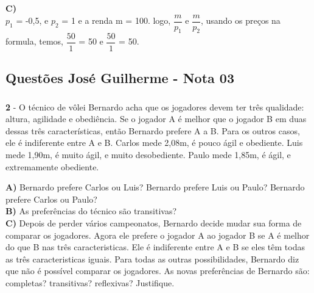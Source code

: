 \begin{flushleft}
\textbf{C)}
\\
$p_{1}$ = -0,5, e $p_{2}$ = 1 e a renda m = 100.
\singlespacing
logo, $\dfrac{m}{p_{1}}$ e $\dfrac{m}{p_{2}}$, usando os preços na formula, temos, $\dfrac{50}{1}$ = 50 e $\dfrac{50}{1}$ = 50. 

\begin{center}

\end{center}

\begin{center}
	\section*{Questões José Guilherme - Nota 03}
\end{center}

\subparagraph{}
\textbf{2} - O técnico de vôlei Bernardo acha que os jogadores devem ter três qualidade: altura, agilidade e obediência. Se o jogador A é melhor que o jogador B em duas dessas três características, então Bernardo prefere A a B. Para os outros casos, ele é indiferente entre A e B. Carlos mede 2,08m, é pouco ágil e obediente. Luis mede 1,90m, é muito ágil, e muito desobediente. Paulo mede 1,85m, é ágil, e extremamente obediente.
\singlespacing

\textbf{A)} Bernardo prefere Carlos ou Luis? Bernardo prefere Luis ou Paulo? Bernardo prefere Carlos ou Paulo?
\\
\textbf{B)} As preferências do técnico são transitivas?
\\
\textbf{C)} Depois de perder vários campeonatos, Bernardo decide mudar sua forma de comparar os jogadores. Agora ele prefere o jogador A ao jogador B se A é melhor do que B nas três caracteristicas. Ele é indiferente entre A e B se eles têm todas as três caracteristicas iguais. Para todas as outras possibilidades, Bernardo diz que não é possível comparar os jogadores. As novas preferências de Bernardo são: completas? transitivas? reflexivas? Justifique.


\end{flushleft}
